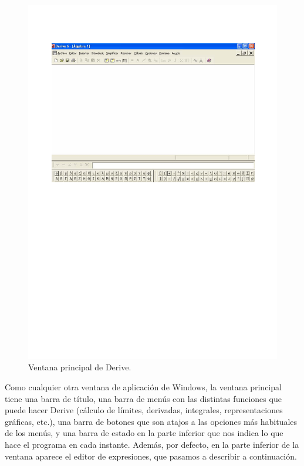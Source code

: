 \begin{figure}[h!]
\begin{center}
\includegraphics[scale=0.9]{img/introduccion_derive/principal}
\caption{Ventana principal de Derive.} \label{g:principal}
\end{center}
\end{figure}


Como cualquier otra ventana de aplicación de Windows, la ventana
principal tiene una barra de título, una barra de menús con las
distintas funciones que puede hacer Derive (cálculo de límites,
derivadas, integrales, representaciones gráficas, etc.), una barra
de botones que son atajos a las opciones más habituales de los
menús, y una barra de estado en la parte inferior que nos indica lo
que hace el programa en cada instante. Además, por defecto, en la
parte inferior de la ventana aparece el editor de expresiones, que
pasamos a describir a continuación.

